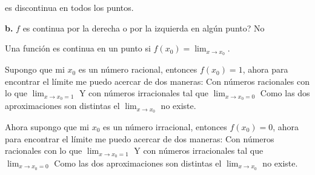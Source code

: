 \documentclass[12pt, letterpaper]{article}
\begin{document}
es discontinua en todos los puntos.

\textbf{b.} $f$ es continua por la derecha o por la izquierda en algún punto? No
 
Una función es continua en un punto si $f(x_0) = \lim_{x \to x_0}$.

Supongo que mi $x_0$ es un número racional, entonces $f(x_0) = 1$, ahora para encontrar el límite me puedo acercar de dos maneras:
Con números racionales con lo que $\lim_{x \to x_0 = 1}$
Y con números irracionales tal que $\lim_{x \to x_0 = 0}$
Como las dos aproximaciones son distintas el $\lim_{x \to x_0}$ no existe.

Ahora supongo que mi $x_0$ es un número irracional, entonces $f(x_0) = 0$, ahora para encontrar el límite me puedo acercar de dos maneras:
Con números racionales con lo que $\lim_{x \to x_0 = 1}$ 
Y con números irracionales tal que $\lim_{x \to x_0 = 0}$
Como las dos aproximaciones son distintas el $\lim_{x \to x_0}$ no existe.
\end{document}
